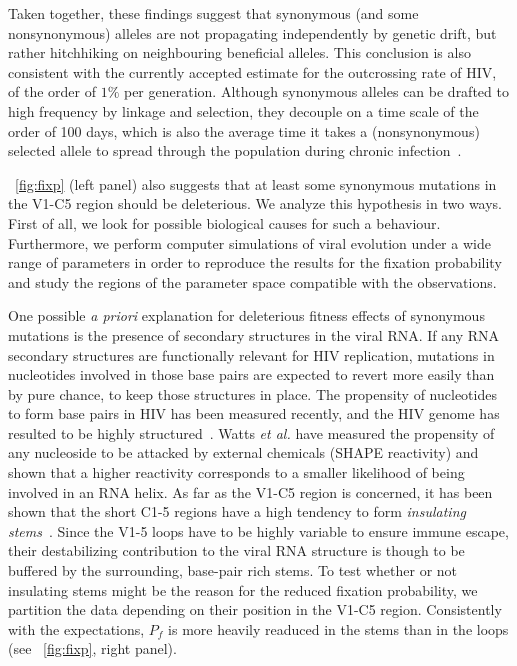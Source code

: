 \documentclass[12pt,a4paper,notitlepage,onecolumn]{article}
\begin{document}
Taken together, these findings suggest that synonymous (and some nonsynonymous)
alleles are not propagating independently by genetic drift, but rather
hitchhiking on neighbouring beneficial alleles. This conclusion is also
consistent with the currently accepted estimate for the outcrossing rate of HIV,
of the order of $1\%$ per generation. Although synonymous alleles can be drafted
to high frequency by linkage and selection, they decouple on a time scale of the
order of 100 days, which is also the average time it takes a (nonsynonymous)
selected allele to spread through the population during chronic
infection~\citep{neher_recombination_2010}.

\figurename~\ref{fig:fixp} (left panel) also suggests that at least some
synonymous mutations in the V1-C5 region should be deleterious. We analyze this
hypothesis in two ways. First of all, we look for possible biological causes for
such a behaviour. Furthermore, we perform computer simulations of viral
evolution under a wide range of parameters in order to reproduce the results for
the fixation probability and study the regions of the parameter space compatible
with the observations.

One possible {\it a priori} explanation for deleterious fitness effects of
synonymous mutations is the presence of secondary structures in the viral RNA.
If any RNA secondary structures are functionally relevant for HIV replication,
mutations in nucleotides involved in those base pairs are expected to revert
more easily than by pure chance, to keep those structures in place. The
propensity of nucleotides to form base pairs in HIV has been measured
recently\citep{watts_architecture_2009}, and the HIV genome has resulted to be
highly structured~\citep{forsdyke_reciprocal_1995, watts_architecture_2009}.
Watts {\it et al.} have measured the propensity of any nucleoside to be attacked by
external chemicals (SHAPE reactivity) and shown that a higher reactivity
corresponds to a smaller likelihood of being involved in an RNA helix. As far as
the V1-C5 region is concerned, it has been shown that the short C1-5 regions
have a high tendency to form {\it insulating
stems}~\citep{watts_architecture_2009, sanjuan_interplay_2011}. Since the V1-5
loops have to be highly variable to ensure immune escape, their destabilizing
contribution to the viral RNA structure is though to be buffered by the
surrounding, base-pair rich stems. To test whether or not insulating stems might
be the reason for the reduced fixation probability, we partition the data
depending on their position in the V1-C5 region. Consistently with the
expectations, $P_f$ is more heavily readuced in the stems than in
the loops (see \figurename~\ref{fig:fixp}, right panel).
\end{document}

